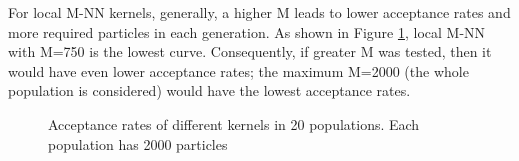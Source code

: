 For local M-NN kernels, generally, a higher M leads to lower acceptance rates and more required particles in each generation. As shown in Figure \ref{fig:acceptance1}, local M-NN with M=750 is the lowest curve. Consequently, if greater M was tested, then it would have even lower acceptance rates; the maximum M=2000 (the whole population is considered) would have the lowest acceptance rates.

\begin{figure}
    \begin{center}
    \end{center}

    \caption[Total required number of sample for different kernels]%
    {Total required samples of different kernels after 20 populations (2000 particles in each population). Different color represents different generations (bottom to top: population 1 to population 20)}
    \label{fig:kernel1}

    \vspace*{\floatsep}

    \begin{center}
    \end{center}

    \caption[Acceptance rates of different kernels]%
    {Acceptance rates of different kernels in 20 populations. Each population has 2000 particles}
    \label{fig:acceptance1}

\end{figure}

